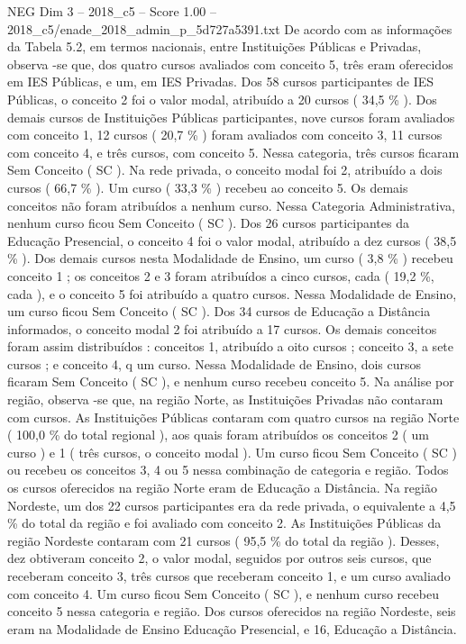 \begin{textsample}{NEG Dim 3 – 2018\_c5 – Score 1.00 – 2018\_c5/enade\_2018\_admin\_p\_5d727a5391.txt}
De acordo com as informações da Tabela 5.2, em termos nacionais, entre Instituições Públicas e Privadas, observa -se que, dos quatro cursos avaliados com conceito 5, três eram oferecidos em IES Públicas, e um, em IES Privadas.
Dos 58 cursos participantes de IES Públicas, o conceito 2 foi o valor modal, atribuído a 20 cursos ( 34,5 \% ).
Dos demais cursos de Instituições Públicas participantes, nove cursos foram avaliados com conceito 1, 12 cursos ( 20,7 \% ) foram avaliados com conceito 3, 11 cursos com conceito 4, e três cursos, com conceito 5.
Nessa categoria, três cursos ficaram Sem Conceito ( SC ).
Na rede privada, o conceito modal foi 2, atribuído a dois cursos ( 66,7 \% ).
Um curso ( 33,3 \% ) recebeu ao conceito 5.
Os demais conceitos não foram atribuídos a nenhum curso.
Nessa Categoria Administrativa, nenhum curso ficou Sem Conceito ( SC ).
Dos 26 cursos participantes da Educação Presencial, o conceito 4 foi o valor modal, atribuído a dez cursos ( 38,5 \% ).
Dos demais cursos nesta Modalidade de Ensino, um curso ( 3,8 \% ) recebeu conceito 1 ; os conceitos 2 e 3 foram atribuídos a cinco cursos, cada ( 19,2 \%, cada ), e o conceito 5 foi atribuído a quatro cursos.
Nessa Modalidade de Ensino, um curso ficou Sem Conceito ( SC ).
Dos 34 cursos de Educação a Distância informados, o conceito modal 2 foi atribuído a 17 cursos.
Os demais conceitos foram assim distribuídos : conceitos 1, atribuído a oito cursos ; conceito 3, a sete cursos ; e conceito 4, q um curso.
Nessa Modalidade de Ensino, dois cursos ficaram Sem Conceito ( SC ), e nenhum curso recebeu conceito 5.
Na análise por região, observa -se que, na região Norte, as Instituições Privadas não contaram com cursos.
As Instituições Públicas contaram com quatro cursos na região Norte ( 100,0 \% do total regional ), aos quais foram atribuídos os conceitos 2 ( um curso ) e 1 ( três cursos, o conceito modal ).
Um curso ficou Sem Conceito ( SC ) ou recebeu os conceitos 3, 4 ou 5 nessa combinação de categoria e região.
Todos os cursos oferecidos na região Norte eram de Educação a Distância.
Na região Nordeste, um dos 22 cursos participantes era da rede privada, o equivalente a 4,5 \% do total da região e foi avaliado com conceito 2.
As Instituições Públicas da região Nordeste contaram com 21 cursos ( 95,5 \% do total da região ).
Desses, dez obtiveram conceito 2, o valor modal, seguidos por outros seis cursos, que receberam conceito 3, três cursos que receberam conceito 1, e um curso avaliado com conceito 4.
Um curso ficou Sem Conceito ( SC ), e nenhum curso recebeu conceito 5 nessa categoria e região.
Dos cursos oferecidos na região Nordeste, seis eram na Modalidade de Ensino Educação Presencial, e 16, Educação a Distância.

\end{textsample}
